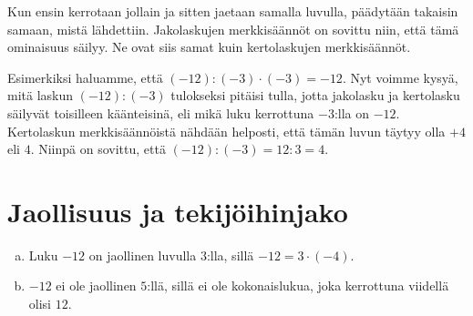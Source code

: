         Kun ensin kerrotaan jollain ja sitten jaetaan samalla luvulla, päädytään takaisin samaan, mistä lähdettiin.  Jakolaskujen merkkisäännöt on sovittu niin, että tämä ominaisuus säilyy. Ne ovat siis samat kuin kertolaskujen merkkisäännöt.
    
    Esimerkiksi haluamme, että $(-12):(-3)\cdot (-3)=-12$. Nyt voimme kysyä, mitä laskun $(-12):(-3)$ tulokseksi pitäisi tulla, jotta jakolasku ja kertolasku säilyvät toisilleen käänteisinä, eli mikä luku kerrottuna $-3$:lla on $-12$. Kertolaskun merkkisäännöistä nähdään helposti, että tämän luvun täytyy olla $+4$ eli $4$. Niinpä on sovittu, että $(-12):(-3)=12:3=4$.



    \section{Jaollisuus ja tekijöihinjako}

   
    
    \begin{esimerkki}
    \begin{enumerate}[a)]
    \item Luku $-12$ on jaollinen luvulla $3$:lla, sillä $-12 = 3 \cdot (-4)$.
    \item $-12$ ei ole jaollinen $5$:llä, sillä ei ole kokonaislukua, joka kerrottuna viidellä olisi $12$.
    \end{enumerate}
    \end{esimerkki}
    
    

